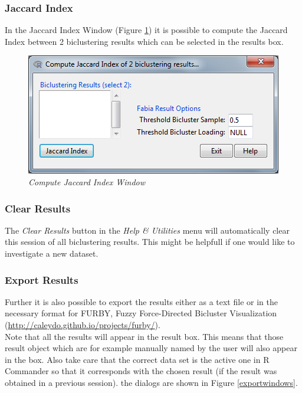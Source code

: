 \documentclass[a4paper]{article}\usepackage[]{graphicx}\usepackage[]{color}
\begin{document}
\subsubsection{Jaccard Index}
\noindent In the Jaccard Index Window (Figure \ref{jaccardindexwindow}) it is
possible to compute the Jaccard Index between 2 biclustering results which can
be selected in the results box.

\begin{figure}[H]
\centering
\includegraphics[scale=0.4]{figures/jaccardindexwindow.png}
\caption{{\it Compute Jaccard Index Window }\label{jaccardindexwindow}}
\end{figure}

\subsubsection{Clear Results}
The {\it Clear Results} button in the {\it Help \& Utilities} menu will
automatically clear this session of all biclustering results. This might be
helpfull if one would like to investigate a new dataset.

\subsubsection{Export Results}
Further it is also possible to export the results either as a text file or in
the necessary format for FURBY, Fuzzy Force-Directed Bicluster Visualization (\url{http://caleydo.github.io/projects/furby/}). \\
Note that all the results will appear in the result box. This means that those
result object which are for example manually named by the user will also appear
in the box. Also take care that the correct data set is the active one in R
Commander so that it corresponds with the chosen result (if the result was
obtained in a previous session). the dialogs are shown in Figure
\ref{exportwindows}.
\end{document}
